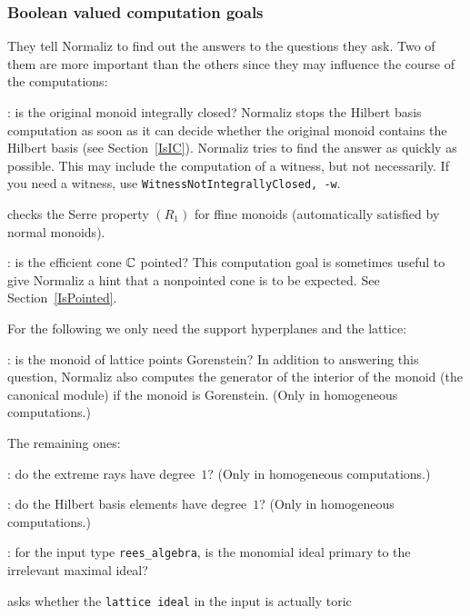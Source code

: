 \subsubsection{Boolean valued computation goals}\label{bool}

They tell Normaliz to find out the answers to the questions they ask. Two of them are more important than the others since they may influence the course of the computations:

\begin{itemize}
	\itemtt[IsIntegrallyClosed]: is the original monoid integrally closed? Normaliz stops the Hilbert basis computation as soon as it can decide whether the original monoid contains the Hilbert basis (see Section~\ref{IsIC}). Normaliz tries to find the answer as quickly as possible. This may include the computation of a witness, but not necessarily. If you need a witness, use \verb|WitnessNotIntegrallyClosed, -w|.
	
	\itemtt[IsSerreR1] checks the Serre property $(R_1)$ for ffine monoids (automatically satisfied by normal monoids).
	
	\itemtt[IsPointed]: is the efficient cone ${\mathbb C}$ pointed? This computation goal is sometimes useful to give Normaliz a hint that a nonpointed cone is to be expected. See Section~\ref{IsPointed}.
\end{itemize}

For the following we only need the support hyperplanes and the lattice:

\begin{itemize}
	\itemtt[IsGorenstein, -G]: is the monoid of lattice points Gorenstein? In addition to answering this question, Normaliz also computes the generator of the interior of the monoid (the canonical module) if the monoid is Gorenstein. (Only in homogeneous computations.)
\end{itemize}

The remaining ones:

\begin{itemize}
	
	: do the extreme rays have degree~$1$? (Only in homogeneous computations.)
	
	: do the Hilbert basis elements have degree~$1$? (Only in homogeneous computations.)
	
	\itemtt[IsReesPrimary]: for the input type \verb|rees_algebra|, is the monomial ideal primary to the irrelevant maximal ideal?
	
	\itemtt[IsLatticeIdealToric] asks whether the \verb|lattice ideal| in the input is actually toric 
	
\end{itemize}

